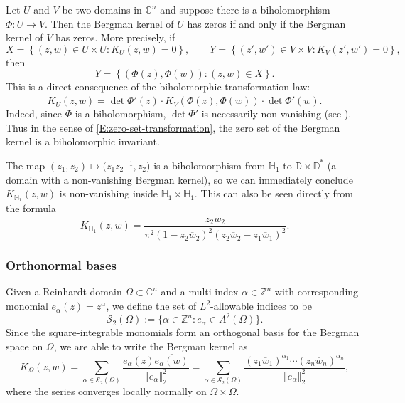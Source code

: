 \documentclass[letterpaper,11pt,reqno]{amsart}
\theoremstyle{plain}
\theoremstyle{definition}
\theoremstyle{remark}
\theoremstyle{remark}
\numberwithin{equation}{section}
\newcommand{\norm}[1]{\left\Vert#1\right\Vert}
\newcommand{\ol}{\overline}
\newcommand{\cs}{{\mathcal S}}
\newcommand{\C}{{\mathbb C}}
\newcommand{\D}{{\mathbb D}}
\newcommand{\h}{{\mathbb H}}
\newcommand{\Z}{{\mathbb Z}}
\begin{document}
Let $U$ and $V$ be two domains in $\C^n$ and suppose there is a biholomorphism $\Phi:U \to V$. 
Then the Bergman kernel of $U$ has zeros if and only if the Bergman kernel of $V$ has zeros.
More precisely, if
\begin{equation*}
X = \left\{ (z,w) \in U \times U : K_U(z,w) = 0 \right\}, \qquad Y = \left\{ (z',w') \in V \times V : K_V(z',w') = 0 \right\},
\end{equation*}
then %
\begin{equation}\label{E:zero-set-transformation}
Y = \left\{ (\Phi(z),\Phi(w)) : (z,w)\in X \right\}.
\end{equation}
This is a direct consequence of the biholomorphic transformation law:%
\begin{equation}\label{E:Berg-biholo-trans-law}
K_U(z,w) = \det\Phi'(z) \cdot K_V(\Phi(z),\Phi(w)) \cdot \ol{\det \Phi'(w)}.
\end{equation}
Indeed, since $\Phi$ is a biholomorphism, $\det\Phi'$ is necessarily non-vanishing (see \cite{Krantz_scv_book}).
Thus in the sense of \eqref{E:zero-set-transformation}, the zero set of the Bergman kernel is a biholomorphic invariant.

The map $(z_1,z_2) \mapsto \big(z_1{z_2}^{-1},z_2\big)$ is a biholomorphism from $\h_1$ to $\D \times \D^*$ (a domain with a non-vanishing Bergman kernel), so we can immediately conclude $K_{\h_1}(z,w)$ is non-vanishing inside $\h_1 \times \h_1$.
This can also be seen directly from the formula
\begin{equation}\label{E:BergKernel-HartogsTri}
K_{\h_1}(z,w) = \frac{z_2 \ol{w}_2}{\pi^2(1-z_2\ol{w}_2)^2 (z_2\ol{w}_2 - z_1\ol{w}_1)^2}.
\end{equation}

\subsubsection{Orthonormal bases}
Given a Reinhardt domain $\Omega \subset \C^n$ and a multi-index $\alpha \in \Z^n$ with corresponding monomial $e_\alpha(z) = z^\alpha$, we define the set of $L^2$-allowable indices to be
\[
\cs_2(\Omega) := \{ \alpha \in \Z^n : e_\alpha \in A^2(\Omega) \}.
\]
Since the square-integrable monomials form an orthogonal basis for the Bergman space on $\Omega$, we are able to write the Bergman kernel as
\begin{equation}\label{E:Berg-kern-infinite-sum}
K_\Omega(z,w) = \sum_{\alpha \in \cs_2(\Omega)} \frac{e_\alpha(z) \ol{e_\alpha(w)}}{\norm{e_\alpha}_2^2}
= \sum_{\alpha \in \cs_2(\Omega)} \frac{ (z_1 \ol{w}_1)^{\alpha_1} \cdots (z_n \ol{w}_n)^{\alpha_n} }{\norm{e_\alpha}_2^2},
\end{equation}
where the series converges locally normally on $\Omega \times \Omega$.
\end{document}
